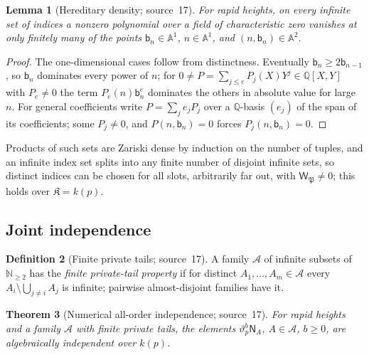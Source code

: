 \documentclass[11pt]{article}
\numberwithin{equation}{section}
\newtheorem{theorem}{Theorem}[section]
\newtheorem{lemma}[theorem]{Lemma}
\theoremstyle{definition}
\newtheorem{definition}[theorem]{Definition}
\theoremstyle{remark}
\newcommand{\Q}{\mathbb Q}
\newcommand{\N}{\mathbb N}
\begin{document}
\begin{lemma}[Hereditary density; source~17]\label{hol:fh:lem:density}
For rapid heights, on every infinite set of indices a nonzero polynomial over
a field of characteristic zero vanishes at only finitely many of the points
$\mathsf b_n\in\mathbb A^1$, $n\in\mathbb A^1$, and $(n,\mathsf b_n)\in\mathbb
A^2$.
\end{lemma}

\begin{proof}
The one-dimensional cases follow from distinctness. Eventually $\mathsf
b_n\ge2\mathsf b_{n-1}$, so $\mathsf b_n$ dominates every power of $n$; for
$0\ne P=\sum_{j\le e}P_j(X)Y^j\in\Q[X,Y]$ with $P_e\ne0$ the term
$P_e(n)\mathsf b_n^e$ dominates the others in absolute value for large $n$.
For general coefficients write $P=\sum_je_jP_j$ over a $\Q$-basis $(e_j)$ of
the span of its coefficients; some $P_j\ne0$, and $P(n,\mathsf b_n)=0$ forces
$P_j(n,\mathsf b_n)=0$.
\end{proof}

Products of such sets are Zariski dense by induction on the number of tuples,
and an infinite index set splits into any finite number of disjoint infinite
sets, so distinct indices can be chosen for all slots, arbitrarily far out,
with $\mathsf W_{\mathfrak P}\ne0$; this holds over $\mathfrak K=k(p)$.

\subsection{Joint independence}\label{hol:fh:sub:independence}

\begin{definition}[Finite private tails; source~17]\label{hol:fh:def:private}
A family $\mathcal A$ of infinite subsets of $\N_{\ge2}$ has the \emph{finite
private-tail property} if for distinct $A_1,\ldots,A_m\in\mathcal A$ every
$A_i\setminus\bigcup_{j\ne i}A_j$ is infinite; pairwise almost-disjoint
families have it.
\end{definition}

\begin{theorem}[Numerical all-order independence; source~17]
\label{hol:fh:thm:numeric}
For rapid heights and a family $\mathcal A$ with finite private tails, the
elements $\vartheta_p^b\mathsf N_A$, $A\in\mathcal A$, $b\ge0$, are
algebraically independent over $k(p)$.
\end{theorem}
\end{document}
